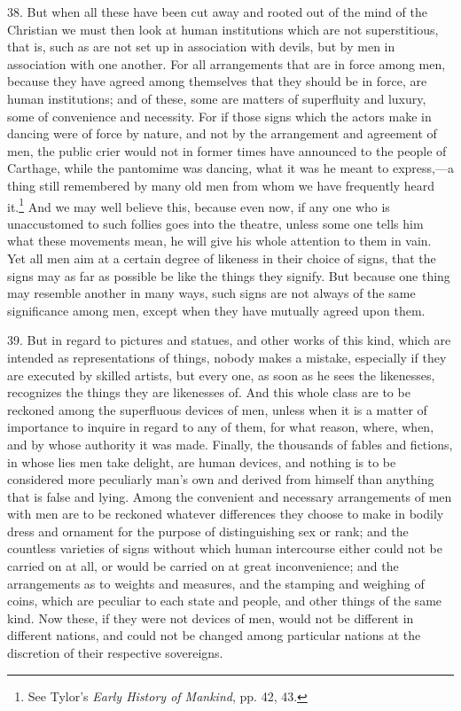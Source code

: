 38. But when all these have been cut away and rooted out of the mind of the Christian we must then look at human institutions which are not superstitious, that is, such as are not set up in association with devils, but by men in association with one another. For all arrangements that are in force among men, because they have agreed among themselves that they should be in force, are human institutions; and of these, some are matters of superfluity and luxury, some of convenience and necessity. For if those signs which the actors make in dancing were of force by nature, and not by the arrangement and agreement of men, the public crier would not in former times have announced to the people of Carthage, while the pantomime was dancing, what it was he meant to express,—a thing still remembered by many old men from whom we have frequently heard it.\footnote{See Tylor’s \emph{Early History of Mankind}, pp. 42, 43.} And we may well believe this, because even now, if any one who is unaccustomed to such follies goes into the theatre, unless some one tells him what these movements mean, he will give his whole attention to them in vain. Yet all men aim at a certain degree of likeness in their choice of signs, that the signs may as far as possible be like the things they signify. But because one thing may resemble another in many ways, such signs are not always of the same significance among men, except when they have mutually agreed upon them.

39. But in regard to pictures and statues, and other works of this kind, which are intended as representations of things, nobody makes a mistake, especially if they are executed by skilled artists, but every one, as soon as he sees the likenesses, recognizes the things they are likenesses of. And this whole class are to be reckoned among the superfluous devices of men, unless when it is a matter of importance to inquire in regard to any of them, for what reason, where, when, and by whose authority it was made. Finally, the thousands of fables and fictions, in whose lies men take delight, are human devices, and nothing is to be considered more peculiarly man’s own and derived from himself than anything that is false and lying. Among the convenient and necessary arrangements of men with men are to be reckoned whatever differences they choose to make in bodily dress and ornament for the purpose of distinguishing sex or rank; and the countless varieties of signs without which human intercourse either could not be carried on at all, or would be carried on at great inconvenience; and the arrangements as to weights and measures, and the stamping and weighing of coins, which are peculiar to each state and people, and other things of the same kind. Now these, if they were not devices of men, would not be different in different nations, and could not be changed among particular nations at the discretion of their respective sovereigns.

